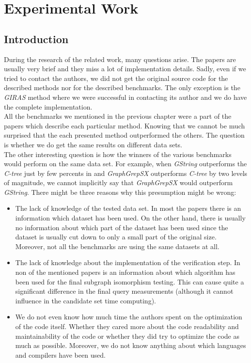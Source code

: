 \chapter{Experimental Work}
\section{Introduction}
During the research of the related work, many questions arise. The papers are usually very brief and they miss a lot of implementation details. Sadly, even if we tried to contact the authors, we did not get the original source code for the described methods nor for the described benchmarks. The only exception is the \textit{GIRAS} method where we were successful in contacting its author and we do have the complete implementation.\\

All the benchmarks we mentioned in the previous chapter were a part of the papers which describe each particular method. Knowing that we cannot be much surprised that the each presented method outperformed the others. The question is whether we do get the same results on different data sets.\\

The other interesting question is how the winners of the various benchmarks would perform on the same data set. For example, when \textit{GString} outperforms the \textit{C-tree} just by few percents in \cite{GString} and \textit{GraphGrepSX} outperforms \textit{C-tree} by two levels of magnitude, we cannot implicitly say that \textit{GraphGrepSX} would outperform \textit{GString}. There might be three reasons why this presumption might be wrong:

\begin{itemize}
	\item The lack of knowledge of the tested data set. In most the papers there is an information which dataset has been used. On the other hand, there is usually no information about which part of the dataset has been used since the dataset is usually cut down to only a small part of the original size. Moreover, not all the benchmarks are using the same datasets at all.
	
	\item The lack of knowledge about the implementation of the verification step. In non of the mentioned papers is an information about which algorithm has been used for the final subgraph isomorphism testing. This can cause quite a significant difference in the final query measurements (although it cannot influence in the candidate set time computing).
	
	\item We do not even know how much time the authors spent on the optimization of the code itself. Whether they cared more about the code readability and maintainability of the code or whether they did try to optimize the code as much as possible. Moreover, we do not know anything about which languages and compilers have been used.
\end{itemize}

